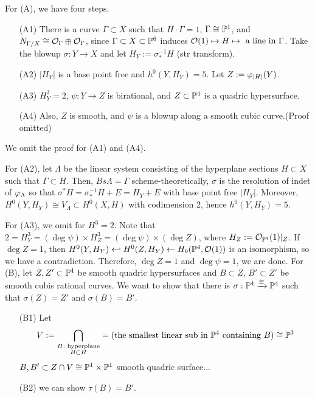 \documentclass{../../small}
\begin{document}
For (A), we have four steps.
\begin{enumerate}
\item[(A1)] There is a curve $\Gamma\subset X$ such that $H\cdot\Gamma=1$, $\Gamma\cong\P^1$, and $N_{\Gamma/X}\cong\cO_\Gamma\oplus\cO_\Gamma$, since $\Gamma\subset X\subset\P^6$ induces $\cO(1)\mapsto H\mapsto\text{ a line in $\Gamma$}$.
Take the blowup $\sigma:Y\to X$ and let $H_Y:=\sigma_*^{-1}H$ (str transform).
\item[(A2)] $|H_Y|$ is a base point free and $h^0(Y,H_Y)=5$.
Let $Z:=\f_{|H|}(Y)$.
\item[(A3)] $H_Y^3=2$, $\psi:Y\to Z$ is birational, and $Z\subset\P^4$ is a quadric hypersurface.
\item[(A4)] Also, $Z$ is smooth, and $\psi$ is a blowup along a smooth cubic curve.(Proof omitted)
\end{enumerate}
We omit the proof for (A1) and (A4).

For (A2), let $\Lambda$ be the linear system consisting of the hyperplane sections $H\subset X$ such that $\Gamma\subset H$.
Then, $Bs\Lambda=\Gamma$ scheme-theoretically, $\sigma$ is the resolution of indet of $\f_\Lambda$ so that $\sigma^*H=\sigma_*^{-1}H+E=H_Y+E$ with base point free $|H_Y|$.
Moreover, $H^0(Y,H_Y)\cong V_\Lambda\subset H^0(X,H)$ with codimension 2, hence $h^0(Y,H_Y)=5$.

For (A3), we omit for $H^3=2$.
Note that $2=H_Y^3=(\deg\psi)\times H_Z^3=(\deg\psi)\times(\deg Z)$, where $H_Z:=\cO_{\P^4}(1)|_Z$.
If $\deg Z=1$, then $H^0(Y,H_Y)\hookleftarrow H^0(Z,H_Y)\leftarrow H_0(\P^4,\cO(1))$ is an isomorphism, so we have a contradiction.
Therefore, $\deg Z=1$ and $\deg\psi=1$, we are done.
\bigskip
For (B), let $Z,Z'\subset\P^4$ be smooth quadric hypersurfaces and $B\subset Z,\,B'\subset Z'$ be smooth cubis rational curves.
We want to show that there is $\sigma:\P^4\xrightarrow{\cong}\P^4$ such that $\sigma(Z)=Z'$ and $\sigma(B)=B'$.
\begin{enumerate}
\item[(B1)] Let
\[V:=\bigcap_{\substack{H:\text{ hyperplane}\\B\subset H}}=(\text{the smallest linear sub in $\P^4$ containing $B$})\cong\P^3\]
$B,B'\subset Z\cap V\cong\P^1\times\P^1$ smooth quadric surface...
\item[(B2)] we can show $\tau(B)=B'$.
\end{enumerate}
\end{document}
